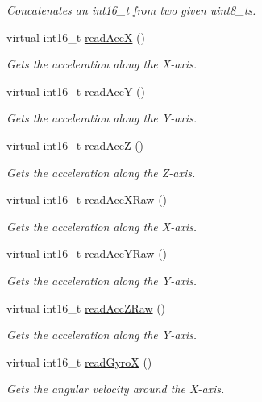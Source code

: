 \begin{DoxyCompactItemize}
\begin{DoxyCompactList}\small\item\em Concatenates an int16\+\_\+t from two given uint8\+\_\+t\textquotesingle{}s. \end{DoxyCompactList}\item 
virtual int16\+\_\+t \hyperlink{classMpu6050_aa79e259de84f90235cc62e7fa10d2ebe}{read\+AccX} ()
\begin{DoxyCompactList}\small\item\em Gets the acceleration along the X-\/axis. \end{DoxyCompactList}\item 
virtual int16\+\_\+t \hyperlink{classMpu6050_aee59cc7d2af6f37d0b559d15070069eb}{read\+AccY} ()
\begin{DoxyCompactList}\small\item\em Gets the acceleration along the Y-\/axis. \end{DoxyCompactList}\item 
virtual int16\+\_\+t \hyperlink{classMpu6050_a5b29cdb8209e51e810cc859acdd90fa7}{read\+AccZ} ()
\begin{DoxyCompactList}\small\item\em Gets the acceleration along the Z-\/axis. \end{DoxyCompactList}\item 
virtual int16\+\_\+t \hyperlink{classMpu6050_a531fe38ae4d91c404863b594bb022ed3}{read\+Acc\+X\+Raw} ()
\begin{DoxyCompactList}\small\item\em Gets the acceleration along the X-\/axis. \end{DoxyCompactList}\item 
virtual int16\+\_\+t \hyperlink{classMpu6050_a3196a0eba88490f3699ddb50dc902604}{read\+Acc\+Y\+Raw} ()
\begin{DoxyCompactList}\small\item\em Gets the acceleration along the Y-\/axis. \end{DoxyCompactList}\item 
virtual int16\+\_\+t \hyperlink{classMpu6050_a6d8a3f3f3a8935fb9349bfd7a6e9d2e6}{read\+Acc\+Z\+Raw} ()
\begin{DoxyCompactList}\small\item\em Gets the acceleration along the Y-\/axis. \end{DoxyCompactList}\item 
virtual int16\+\_\+t \hyperlink{classMpu6050_a9ec9443071ff4c69d08aa5aada80a1ad}{read\+GyroX} ()
\begin{DoxyCompactList}\small\item\em Gets the angular velocity around the X-\/axis. \end{DoxyCompactList}\item 

\end{DoxyCompactItemize}
